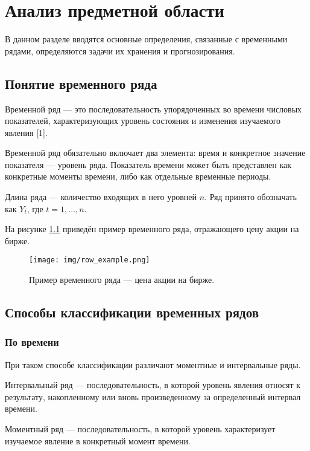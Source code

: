 \chapter{Анализ предметной области}

В данном разделе вводятся основные определения, связанные с временными рядами, определяются задачи
их хранения и прогнозирования.

\section{Понятие временного ряда}

Временной ряд — это последовательность упорядоченных во времени числовых показателей, характеризующих 
уровень состояния и изменения изучаемого явления [1].

Временной ряд обязательно включает два элемента: время и конкретное значение показателя — уровень
ряда. Показатель времени может быть представлен как конкретные моменты времени, либо 
как отдельные временные периоды. 

Длина ряда — количество входящих в него уровней $n$.
Ряд принято обозначать как $Y_{t}$, где $t = 1, \ldots, n$.

На рисунке \ref{fig:row_example} приведён пример временного ряда, отражающего цену акции на бирже.

\begin{figure}[H]
	\centering
	\texttt{[image: img/row\_example.png]}
	\caption{Пример временного ряда — цена акции на бирже.}
	\label{fig:row_example}
\end{figure}

\section{Способы классификации временных рядов}

\subsection{По времени}

При таком способе классификации различают моментные и интервальные ряды. 

Интервальный ряд — последовательность, в которой уровень явления относят к результату, накопленному или вновь 
произведенному за определенный интервал времени.

Моментный ряд — последовательность, в которой уровень характеризует изучаемое явление в 
конкретный момент времени.

